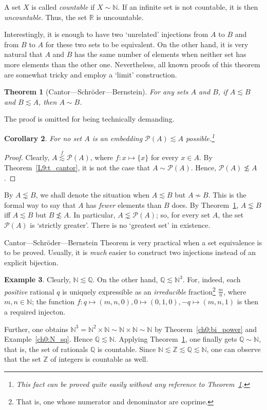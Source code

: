 \documentclass[12pt,notitlepage]{article}
\theoremstyle{plain}
\newtheorem{thm}{Theorem}[section]
\newtheorem{corr}[thm]{Corollary}
\theoremstyle{definition}
\newtheorem{exm}[thm]{Example}
\theoremstyle{plain}
\newcommand{\N}{\mathbb{N}}
\newcommand{\Z}{\mathbb{Z}}
\newcommand{\Q}{\mathbb{Q}}
\newcommand{\R}{\mathbb{R}}
\newcommand{\mP}{\mathcal{P}}
\newcommand{\1}{\mathbf{1}}
\newcommand{\0}{\mathbf{0}}
\begin{document}
A set $X$ is called \emph{countable} if $X \sim \N$. If an infinite set is not countable, it is then \emph{uncountable}. Thus, the set $\R$ is uncountable.

Interestingly, it is enough to have two `unrelated' injections from $A$ to $B$ and from $B$ to $A$ for these two sets to be equivalent. On the other hand, it is very natural that $A$ and $B$ has the same number of elements when neither set has more elements than the other one. Nevertheless, all known proofs of this theorem are somewhat tricky and employ a `limit' construction.
\begin{thm}[Cantor---Schr\"oder---Bernstein]\label{ch0:bernstein} For any sets $A$ and $B$, if $A \lesssim B$ and $B \lesssim A$, then $A \sim B$.
\end{thm}
\noindent The proof is omitted for being technically demanding.

\begin{corr}
For no set $A$ is an embedding $\mP(A) \lesssim A$ possible.\footnote{This fact can be proved quite easily without any reference to Theorem~\ref{ch0:bernstein}.}
\end{corr}
\begin{proof}
Clearly, $A \stackrel{f}{\lesssim} \mP(A)$, where $f\colon x \mapsto \{ x \}$ for every $x \in A$. By Theorem~\ref{L9:t_cantor}, it is not the case that $A \sim \mP(A)$. Hence, $\mP(A) \not\lesssim A$.
\end{proof}

By $A \lnsim B$, we shall denote the situation when $A \lesssim B$ but $A \nsim B$. This is the formal way to say that $A$ has \emph{fewer} elements than $B$ does. By Theorem~\ref{ch0:bernstein}, $A \lnsim B$ iff $A \lesssim B$ but  $B \not\lesssim A$. In particular, $A \lnsim \mP(A)$; so, for every set $A$, the set $\mP(A)$ is `strictly greater'. There is no `greatest set' in existence.

\medskip

Cantor---Schr\"oder---Bernstein Theorem is very practical when a set equivalence is to be proved. Usually, it is \emph{much} easier to construct two injections instead of an explicit bijection.
\begin{exm}
Clearly, $\N \lesssim \Q$. On the other hand, $\Q \lesssim \N^3$. For, indeed, each \emph{positive} rational $q$ is uniquely expressible as an \emph{irreducible} fraction\footnote{That is, one whose numerator and denominator are coprime.} $\frac{m}{n}$, where $m, n \in \N$; the function $f\colon q \mapsto (m,n,0), 0 \mapsto (0,1,0), -q \mapsto (m,n,1)$ is then a required injecton.

Further, one obtains $\N^3 = \N^2 \times \N \sim \N \times \N \sim \N$ by Theorem~\ref{ch0:bi_power} and Example~\ref{ch0:N_sq}. Hence $\Q \lesssim \N$. Applying Theorem~\ref{ch0:bernstein}, one finally gets $\Q \sim \N$, that is, the set of rationals $\Q$ is countable. Since $\N \lesssim \Z \lesssim \Q \lesssim \N$, one can observe that the set $\Z$ of integers is countable as well.
\end{exm}
\end{document}
